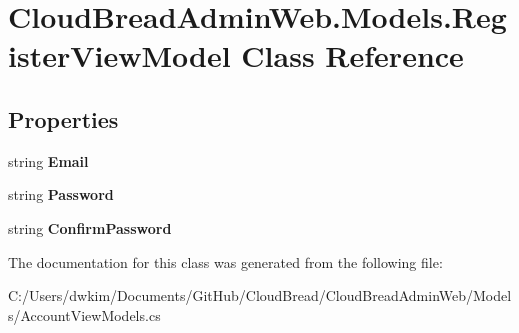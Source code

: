 \hypertarget{a00172}{}\section{Cloud\+Bread\+Admin\+Web.\+Models.\+Register\+View\+Model Class Reference}
\label{a00172}
\subsection*{Properties}
\begin{DoxyCompactItemize}
\item 
string {\bfseries Email}\hypertarget{a00172_afa584697bb9ca879fcd0ae4008a1605d}{}\label{a00172_afa584697bb9ca879fcd0ae4008a1605d}

\item 
string {\bfseries Password}\hypertarget{a00172_a4b430dcdad4c3d453dbe6a34eeb292a3}{}\label{a00172_a4b430dcdad4c3d453dbe6a34eeb292a3}

\item 
string {\bfseries Confirm\+Password}\hypertarget{a00172_ab6f369eb2760e39c642a7ecaa29781c2}{}\label{a00172_ab6f369eb2760e39c642a7ecaa29781c2}

\end{DoxyCompactItemize}


The documentation for this class was generated from the following file\+:\begin{DoxyCompactItemize}
\item 
C\+:/\+Users/dwkim/\+Documents/\+Git\+Hub/\+Cloud\+Bread/\+Cloud\+Bread\+Admin\+Web/\+Models/Account\+View\+Models.\+cs\end{DoxyCompactItemize}
